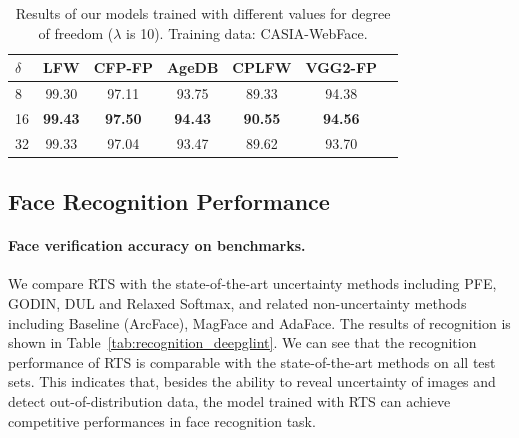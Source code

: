 \documentclass[letterpaper]{article} %
\begin{document}
\begin{table}
\begin{center}
\begin{tabular}{|l|c|c|c|c|c|c|}
\hline
$\delta$ & LFW & CFP-FP & AgeDB & CPLFW & VGG2-FP \\
\hline\hline
8 & 99.30 & 97.11 & 93.75 & 89.33 & 94.38 \\
16 & \textbf{99.43} & \textbf{97.50} & \textbf{94.43} & \textbf{90.55} & \textbf{94.56} \\
32 & 99.33 & 97.04 & 93.47 & 89.62 & 93.70 \\
\hline
\end{tabular}
\end{center}
\caption{Results of our models trained with different values for degree of freedom ($\lambda$ is 10). Training data: CASIA-WebFace.}
\label{tab:degree_of_freedom}
\end{table}





\subsection{Face Recognition Performance}
\label{ssec:face recognition}
\paragraph{Face verification accuracy on benchmarks.} We compare RTS with the state-of-the-art uncertainty methods including PFE, GODIN, DUL and Relaxed Softmax, and related non-uncertainty methods including Baseline (ArcFace), MagFace and AdaFace.
%
The results of recognition is shown in Table~\ref{tab:recognition_deepglint}. We can see that the recognition performance of RTS is comparable with the state-of-the-art methods on all test sets. This indicates that, besides the ability to reveal uncertainty of images and detect out-of-distribution data, the model trained with RTS can achieve competitive performances in face recognition task.
\end{document}
